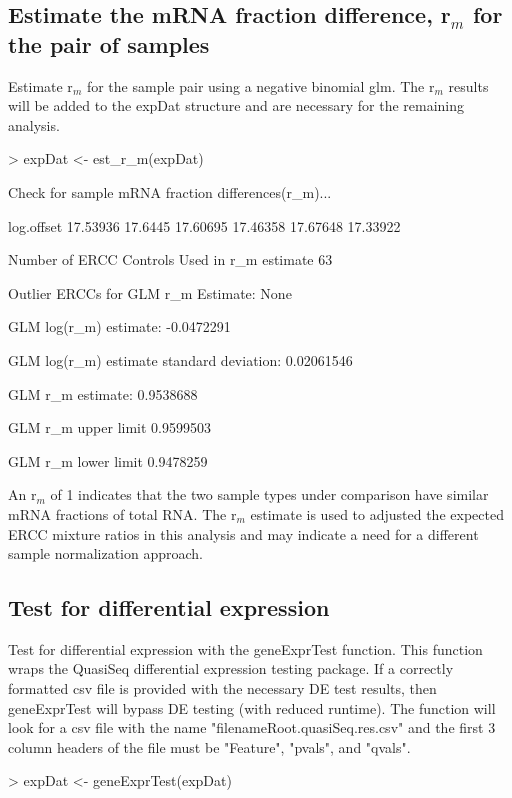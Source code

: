 \documentclass{article}
\begin{document}
\subsection{Estimate the mRNA fraction difference, r$_m$ for the pair of 
samples}
Estimate r$_m$ for the sample pair using a negative binomial glm. The r$_m$ 
results will be added to the expDat structure and are necessary for the 
remaining analysis.
\begin{center}
\begin{Schunk}
\begin{Sinput}
> expDat <- est_r_m(expDat)
\end{Sinput}
\begin{Soutput}
Check for sample mRNA fraction differences(r_m)...

log.offset
17.53936 17.6445 17.60695 17.46358 17.67648 17.33922 

Number of ERCC Controls Used in r_m estimate
63 

Outlier ERCCs for GLM r_m Estimate:
None 

GLM log(r_m) estimate:
-0.0472291 

GLM log(r_m) estimate standard deviation:
0.02061546 
 
GLM r_m estimate:
0.9538688 

GLM r_m upper limit
0.9599503 

GLM r_m lower limit
0.9478259 
\end{Soutput}
\end{Schunk}
\end{center}
An r$_m$ of 1 indicates that the two sample types under comparison have similar
mRNA fractions of total RNA. The r$_m$ estimate is used to adjusted the expected
ERCC mixture ratios in this analysis and may indicate a need for a different
sample normalization approach.

\subsection{Test for differential expression}
Test for differential expression with the geneExprTest function. This function
wraps the QuasiSeq differential expression testing package. If a correctly
formatted csv file is provided with the necessary DE test results, then 
geneExprTest will bypass DE testing (with reduced runtime). The function will
look for a csv file with the name "filenameRoot.quasiSeq.res.csv" and the first
3 column headers of the file must be "Feature", "pvals", and "qvals".
\begin{center}
\begin{Schunk}
\begin{Sinput}
> expDat <- geneExprTest(expDat)
\end{Sinput}
\end{Schunk}
\end{center}
\end{document}
